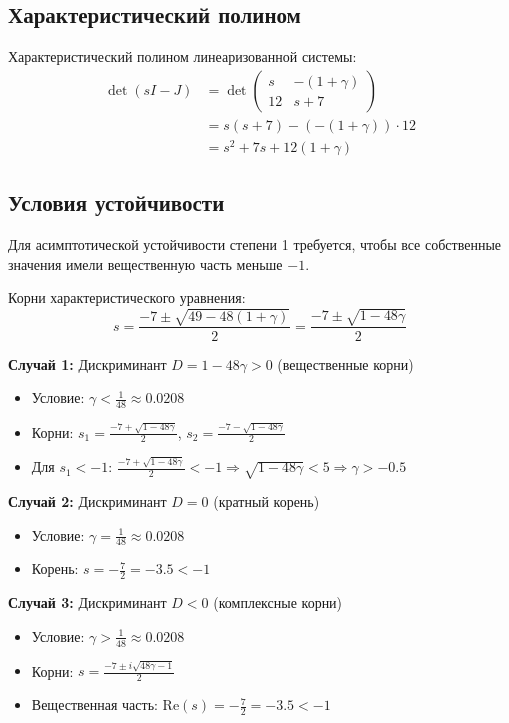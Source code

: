 \subsection*{Характеристический полином}

Характеристический полином линеаризованной системы:
\begin{align}
\det(sI - J) &= \det\begin{pmatrix} s & -(1+\gamma) \\ 12 & s+7 \end{pmatrix} \\
&= s(s+7) - (-(1+\gamma)) \cdot 12 \\
&= s^2 + 7s + 12(1+\gamma)
\end{align}

\subsection*{Условия устойчивости}

Для асимптотической устойчивости степени 1 требуется, чтобы все собственные значения имели вещественную часть меньше $-1$.

Корни характеристического уравнения:
\begin{equation}
s = \frac{-7 \pm \sqrt{49 - 48(1+\gamma)}}{2} = \frac{-7 \pm \sqrt{1-48\gamma}}{2}
\end{equation}

\textbf{Случай 1:} Дискриминант $D = 1 - 48\gamma > 0$ (вещественные корни)
\begin{itemize}
\item Условие: $\gamma < \frac{1}{48} \approx 0.0208$
\item Корни: $s_1 = \frac{-7 + \sqrt{1-48\gamma}}{2}$, $s_2 = \frac{-7 - \sqrt{1-48\gamma}}{2}$
\item Для $s_1 < -1$: $\frac{-7 + \sqrt{1-48\gamma}}{2} < -1 \Rightarrow \sqrt{1-48\gamma} < 5 \Rightarrow \gamma > -0.5$
\end{itemize}

\textbf{Случай 2:} Дискриминант $D = 0$ (кратный корень)
\begin{itemize}
\item Условие: $\gamma = \frac{1}{48} \approx 0.0208$
\item Корень: $s = -\frac{7}{2} = -3.5 < -1$
\end{itemize}

\textbf{Случай 3:} Дискриминант $D < 0$ (комплексные корни)
\begin{itemize}
\item Условие: $\gamma > \frac{1}{48} \approx 0.0208$
\item Корни: $s = \frac{-7 \pm i\sqrt{48\gamma-1}}{2}$
\item Вещественная часть: $\text{Re}(s) = -\frac{7}{2} = -3.5 < -1$
\end{itemize}

